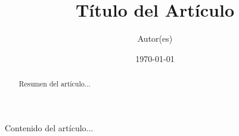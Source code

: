 \documentclass{article}
\begin{document}
\title{Título del Artículo}
\author{Autor(es)}
\date{\today}
\maketitle
\begin{abstract}
Resumen del artículo...
\end{abstract}
Contenido del artículo...
\end{document}
